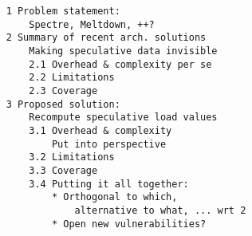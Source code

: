 \begin{verbatim}
    1 Problem statement: 
        Spectre, Meltdown, ++?
    2 Summary of recent arch. solutions
        Making speculative data invisible
        2.1 Overhead & complexity per se
        2.2 Limitations
        2.3 Coverage
    3 Proposed solution: 
        Recompute speculative load values
        3.1 Overhead & complexity 
            Put into perspective
        3.2 Limitations 
        3.3 Coverage
        3.4 Putting it all together:
            * Orthogonal to which, 
                alternative to what, ... wrt 2
            * Open new vulnerabilities?
\end{verbatim}
